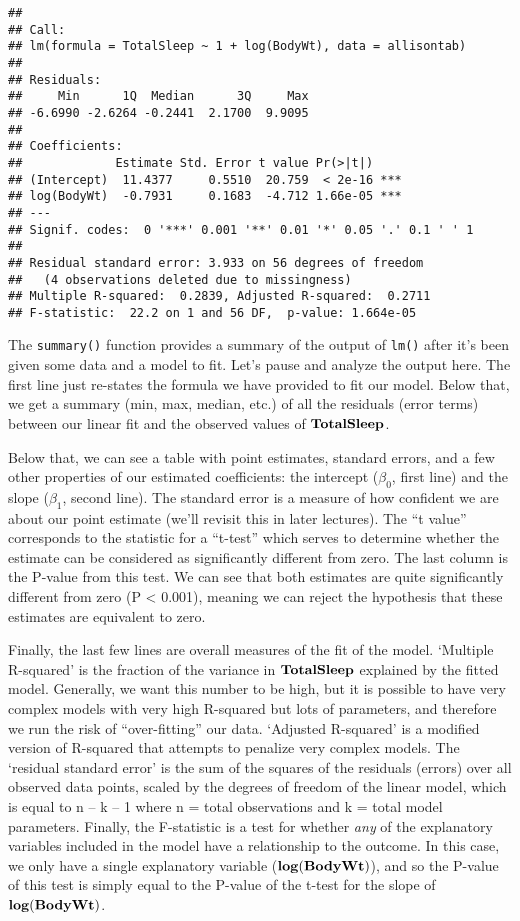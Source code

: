 \documentclass[
]{book}
\begin{document}
\begin{verbatim}
## 
## Call:
## lm(formula = TotalSleep ~ 1 + log(BodyWt), data = allisontab)
## 
## Residuals:
##     Min      1Q  Median      3Q     Max 
## -6.6990 -2.6264 -0.2441  2.1700  9.9095 
## 
## Coefficients:
##             Estimate Std. Error t value Pr(>|t|)    
## (Intercept)  11.4377     0.5510  20.759  < 2e-16 ***
## log(BodyWt)  -0.7931     0.1683  -4.712 1.66e-05 ***
## ---
## Signif. codes:  0 '***' 0.001 '**' 0.01 '*' 0.05 '.' 0.1 ' ' 1
## 
## Residual standard error: 3.933 on 56 degrees of freedom
##   (4 observations deleted due to missingness)
## Multiple R-squared:  0.2839, Adjusted R-squared:  0.2711 
## F-statistic:  22.2 on 1 and 56 DF,  p-value: 1.664e-05
\end{verbatim}

The \texttt{summary()} function provides a summary of the output of \texttt{lm()} after it's been given some data and a model to fit. Let's pause and analyze the output here. The first line just re-states the formula we have provided to fit our model. Below that, we get a summary (min, max, median, etc.) of all the residuals (error terms) between our linear fit and the observed values of \(\bf{TotalSleep}\).

Below that, we can see a table with point estimates, standard errors, and a few other properties of our estimated coefficients: the intercept (\(\beta_0\), first line) and the slope (\(\beta_1\), second line). The standard error is a measure of how confident we are about our point estimate (we'll revisit this in later lectures). The ``t value'' corresponds to the statistic for a ``t-test'' which serves to determine whether the estimate can be considered as significantly different from zero. The last column is the P-value from this test. We can see that both estimates are quite significantly different from zero (P \textless{} 0.001), meaning we can reject the hypothesis that these estimates are equivalent to zero.

Finally, the last few lines are overall measures of the fit of the model. `Multiple R-squared' is the fraction of the variance in \(\bf{TotalSleep}\) explained by the fitted model. Generally, we want this number to be high, but it is possible to have very complex models with very high R-squared but lots of parameters, and therefore we run the risk of ``over-fitting'' our data. `Adjusted R-squared' is a modified version of R-squared that attempts to penalize very complex models. The `residual standard error' is the sum of the squares of the residuals (errors) over all observed data points, scaled by the degrees of freedom of the linear model, which is equal to n -- k -- 1 where n = total observations and k = total model parameters. Finally, the F-statistic is a test for whether \emph{any} of the explanatory variables included in the model have a relationship to the outcome. In this case, we only have a single explanatory variable (\(\bf{log(BodyWt)}\)), and so the P-value of this test is simply equal to the P-value of the t-test for the slope of \(\bf{log(BodyWt)}\).
\end{document}
